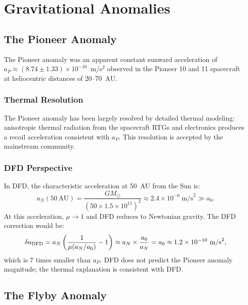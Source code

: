 \documentclass[aps,prd,twocolumn,superscriptaddress,nofootinbib]{revtex4-2}
\begin{document}
\section{Gravitational Anomalies}\label{sec:anomalies}

\subsection{The Pioneer Anomaly}

The Pioneer anomaly was an apparent constant sunward acceleration
of $a_P \approx (8.74 \pm 1.33)\times 10^{-10}$~m/s$^2$ observed
in the Pioneer 10 and 11 spacecraft at heliocentric distances of
20--70~AU.

\subsubsection{Thermal Resolution}

The Pioneer anomaly has been largely resolved by detailed thermal
modeling: anisotropic thermal radiation from the spacecraft RTGs
and electronics produces a recoil acceleration consistent with
$a_P$. This resolution is accepted by the mainstream community.

\subsubsection{DFD Perspective}

In DFD, the characteristic acceleration at 50~AU from the Sun is:
\begin{equation}
a_N(50~\text{AU}) = \frac{GM_\odot}{(50\times 1.5\times10^{11})^2}
\approx 2.4\times10^{-6}~\text{m/s}^2 \gg a_0.
\end{equation}
At this acceleration, $\mu \to 1$ and DFD reduces to Newtonian
gravity. The DFD correction would be:
\begin{equation}
\delta a_{\rm DFD} = a_N\left(\frac{1}{\mu(a_N/a_0)} - 1\right)
\approx a_N\times\frac{a_0}{a_N} = a_0 \approx 1.2\times10^{-10}~\text{m/s}^2,
\end{equation}
which is 7 times smaller than $a_P$. DFD does not predict
the Pioneer anomaly magnitude; the thermal explanation is
consistent with DFD.

\subsection{The Flyby Anomaly}
\end{document}
